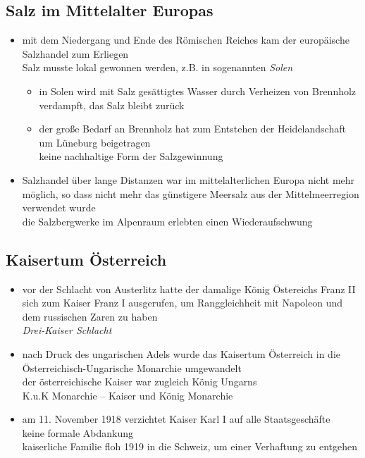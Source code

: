 \documentclass[11pt,a4paper]{article}
\begin{document}
\subsection*{\textsf{Salz im Mittelalter Europas}}

\begin{itemize}

\item mit dem Niedergang und Ende des Römischen Reiches kam der europäische Salzhandel zum Erliegen\\
 Salz musste lokal gewonnen werden, z.B. in sogenannten \textsl{Solen}

	\begin{itemize}
	\item in Solen wird mit Salz gesättigtes Wasser durch Verheizen von Brennholz verdampft, das Salz bleibt zurück
	\item der große Bedarf an Brennholz hat zum Entstehen der Heidelandschaft um Lüneburg beigetragen\\
	 keine nachhaltige Form der Salzgewinnung
	\end{itemize}

\item Salzhandel über lange Distanzen war im mittelalterlichen Europa nicht mehr möglich, so dass nicht mehr das günstigere Meersalz aus der Mittelmeerregion verwendet wurde\\
 die Salzbergwerke im Alpenraum erlebten einen Wiederaufschwung

\end{itemize}


\subsection*{\textsf{Kaisertum Österreich}}

\begin{itemize}

\item vor der Schlacht von Austerlitz hatte der damalige König Östereichs Franz II sich zum Kaiser Franz I ausgerufen, um Ranggleichheit mit Napoleon und dem russischen Zaren zu haben\\
 \textsl{Drei-Kaiser Schlacht}

\item nach Druck des ungarischen Adels wurde das Kaisertum Österreich in die Österreichisch-Ungarische Monarchie umgewandelt\\
 der österreichische Kaiser war zugleich König Ungarns\\
 K.u.K Monarchie -- Kaiser und König Monarchie

\item am 11. November 1918 verzichtet Kaiser Karl I auf alle Staatsgeschäfte\\
 keine formale Abdankung\\
 kaiserliche Familie floh 1919 in die Schweiz, um einer Verhaftung zu entgehen


\end{itemize}
\end{document}
